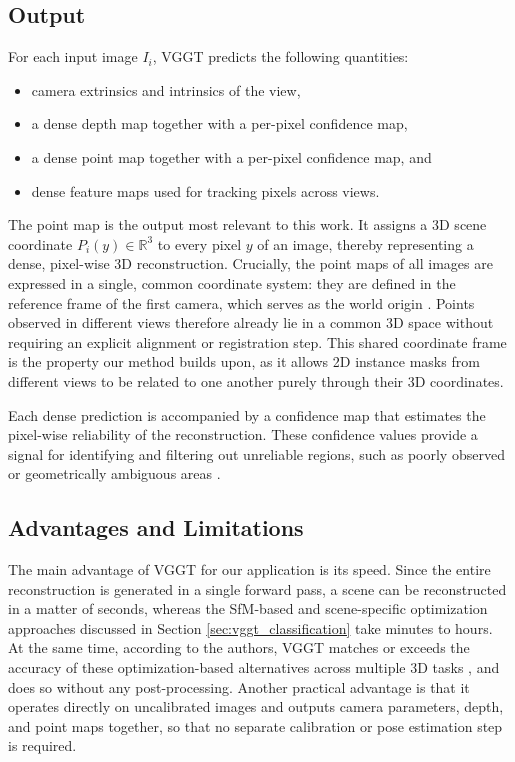 \documentclass[english, egger, bsc]{vcethesis}
\begin{document}
\subsection{Output}
\label{sec:vggt_output}
For each input image $I_i$, VGGT predicts the following quantities:
\begin{itemize}
    \item camera extrinsics and intrinsics of the view,
    \item a dense depth map together with a per-pixel confidence map,
    \item a dense point map together with a per-pixel confidence map, and
    \item dense feature maps used for tracking pixels across views.
\end{itemize}
The point map is the output most relevant to this work. It assigns a 3D scene coordinate $P_i(y) \in \mathbb{R}^{3}$ to every pixel $y$ of an image, thereby representing a dense, pixel-wise 3D reconstruction. Crucially, the point maps of all images are expressed in a single, common coordinate system: they are defined in the reference frame of the first camera, which serves as the world origin \cite{wang2025vggt}. Points observed in different views therefore already lie in a common 3D space without requiring an explicit alignment or registration step. This shared coordinate frame is the property our method builds upon, as it allows 2D instance masks from different views to be related to one another purely through their 3D coordinates. 

Each dense prediction is accompanied by a confidence map that estimates the pixel-wise reliability of the reconstruction. These confidence values provide a signal for identifying and filtering out unreliable regions, such as poorly observed or geometrically ambiguous areas \cite{wang2025vggt}.

\subsection{Advantages and Limitations}
\label{sec:vggt_advantages}
The main advantage of VGGT for our application is its speed. Since the entire reconstruction is generated in a single forward pass, a scene can be reconstructed in a matter of seconds, whereas the SfM-based and scene-specific optimization approaches discussed in Section \ref{sec:vggt_classification} take minutes to hours. At the same time, according to the authors, VGGT matches or exceeds the accuracy of these optimization-based alternatives across multiple 3D tasks \cite{wang2025vggt}, and does so without any post-processing. Another practical advantage is that it operates directly on uncalibrated images and outputs camera parameters, depth, and point maps together, so that no separate calibration or pose estimation step is required.
\end{document}
